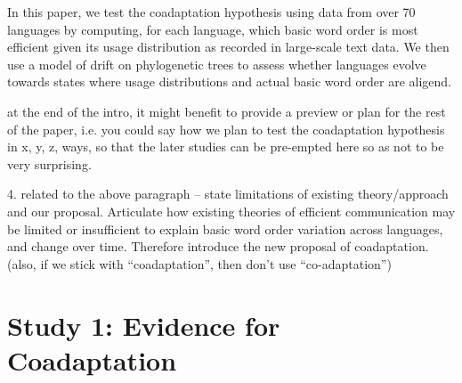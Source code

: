 \documentclass[11pt,a4paper]{article}
\newcommand\comment[1]{{\color{red}#1}}
\newcommand\mhahn[1]{{\color{red}(#1)}}
\begin{document}


In this paper, we test the coadaptation hypothesis using data from over 70 languages by computing, for each language, which basic word order is most efficient given its usage distribution as recorded in large-scale text data.
We then use a model of drift on phylogenetic trees to assess whether languages evolve towards states where usage distributions and actual basic word order are aligend.


\comment{at the end of the intro, it might benefit to provide a preview or plan for the rest of the paper, i.e. you could say how we plan to test the coadaptation hypothesis in x, y, z, ways, so that the later studies can be pre-empted here so as not to be very surprising.}

{\color{blue}4. related to the above paragraph -- state limitations of existing theory/approach and our proposal. Articulate how existing theories of efficient communication may be limited or insufficient to explain basic word order variation across languages, and change over time. Therefore introduce the new proposal of coadaptation. (also, if we stick with ``coadaptation'', then don't use ``co-adaptation'') }
















\section{Study 1: Evidence for Coadaptation}
\end{document}

